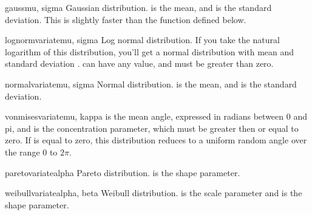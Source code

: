 \begin{funcdesc}{gauss}{mu, sigma}
Gaussian distribution.   is the mean, and  is the
standard deviation.  This is slightly faster than the
 function defined below.
\end{funcdesc}

\begin{funcdesc}{lognormvariate}{mu, sigma}
Log normal distribution.  If you take the natural logarithm of this
distribution, you'll get a normal distribution with mean  and
standard deviation .   can have any value, and 
must be greater than zero.  
\end{funcdesc}

\begin{funcdesc}{normalvariate}{mu, sigma}
Normal distribution.   is the mean, and  is the
standard deviation.
\end{funcdesc}

\begin{funcdesc}{vonmisesvariate}{mu, kappa}
 is the mean angle, expressed in radians between 0 and pi,
and  is the concentration parameter, which must be greater
then or equal to zero.  If  is equal to zero, this
distribution reduces to a uniform random angle over the range 0 to
$2\pi$.
\end{funcdesc}

\begin{funcdesc}{paretovariate}{alpha}
Pareto distribution.   is the shape parameter.
\end{funcdesc}

\begin{funcdesc}{weibullvariate}{alpha, beta}
Weibull distribution.   is the scale parameter and
 is the shape parameter.
\end{funcdesc}

\begin{seealso}
\end{seealso}

